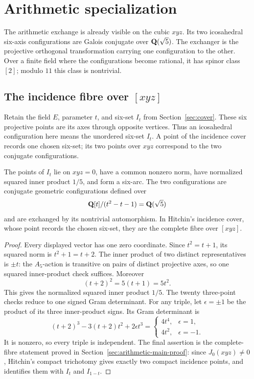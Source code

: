 \section{Arithmetic specialization}
\label{sec:arithmetic}

The arithmetic exchange is already visible on the cubic \(xyz\).  Its two
icosahedral six-axis configurations are Galois conjugate over
\(\mathbf Q(\sqrt5)\).  The exchanger is the projective orthogonal transformation
carrying one configuration to the other.  Over a finite field where the
configurations become rational, it has spinor class \([2]\); modulo \(11\)
this class is nontrivial.

\subsection{The incidence fibre over \texorpdfstring{$[xyz]$}{[xyz]}}
\label{sec:incidence-fibre}

Retain the field \(E\), parameter \(t\), and six-set \(I_t\) from
Section~\ref{sec:cover}.
These six projective points are its axes through opposite vertices.  Thus
an icosahedral configuration here means the unordered six-set \(I_t\).
A point of the incidence cover records one chosen six-set; its two points
over \(xyz\) correspond to the two conjugate configurations.

\begin{proposition}
\label{prop:incidence-fibre}
The points of \(I_t\) lie on \(xyz=0\), have a common nonzero norm, have
normalized squared inner product \(1/5\), and form a six-arc.  The two
configurations are conjugate geometric configurations defined over
\[
 \mathbf Q[t]/(t^2-t-1)=\mathbf Q(\sqrt5)
\]
and are exchanged by its nontrivial automorphism.  In Hitchin's incidence
cover, whose point records the chosen six-set, they are the complete fibre
over \([xyz]\).
\end{proposition}

\begin{proof}
Every displayed vector has one zero coordinate.  Since \(t^2=t+1\), its
squared norm is \(t^2+1=t+2\).  The inner product of two distinct
representatives is \(\pm t\): the \(A_5\)-action is transitive on pairs of
distinct projective axes, so one squared inner-product check suffices.  Moreover
\[
 (t+2)^2=5(t+1)=5t^2.
\]
This gives the normalized squared inner product \(1/5\).  The twenty
three-point checks reduce to one signed Gram determinant.  For any triple,
let \(\epsilon=\pm1\) be the product of its three inner-product signs.  Its
Gram determinant is
\[
 (t+2)^3-3(t+2)t^2+2\epsilon t^3
 =\begin{cases}4t^4,&\epsilon=1,\\4t^2,&\epsilon=-1.\end{cases}
\]
It is nonzero, so every triple is independent.
The final assertion is the complete-fibre statement proved in
Section~\ref{sec:arithmetic-main-proof}: since \(J_0(xyz)\ne0\), Hitchin's
compact trichotomy \cite[Theorem~5]{HitchinBundles} gives exactly two compact
incidence points, and \cite[\S\S3, 7--9]{HitchinIcosahedron} identifies them
with \(I_t\) and \(I_{1-t}\).
\end{proof}

